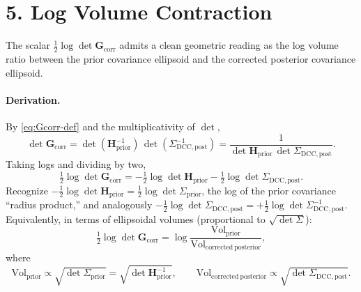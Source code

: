 \documentclass[11pt]{article}
\begin{document}
\section*{5. Log Volume Contraction}

The scalar $\tfrac{1}{2} \log \det \mathbf G_{\mathrm{corr}}$ admits a clean geometric reading as the log volume ratio between the prior covariance ellipsoid and the corrected posterior covariance ellipsoid.

\paragraph{Derivation.}
By \eqref{eq:Gcorr-def} and the multiplicativity of $\det$,
\begin{equation}
\det \mathbf G_{\mathrm{corr}}
=
\det(\mathbf H_{\mathrm{prior}}^{-1})\,
\det(\Sigma_{\mathrm{DCC},\mathrm{post}}^{-1})
=
\frac{1}{\det \mathbf H_{\mathrm{prior}}\, \det \Sigma_{\mathrm{DCC},\mathrm{post}}}.
\label{eq:detGcorr-ratio}
\end{equation}
Taking logs and dividing by two,
\begin{equation}
\tfrac{1}{2} \log \det \mathbf G_{\mathrm{corr}}
=
- \tfrac{1}{2} \log \det \mathbf H_{\mathrm{prior}}
- \tfrac{1}{2} \log \det \Sigma_{\mathrm{DCC},\mathrm{post}}.
\label{eq:logdetGcorr-decomp}
\end{equation}
Recognize $-\tfrac{1}{2} \log \det \mathbf H_{\mathrm{prior}} = \tfrac{1}{2} \log \det \Sigma_{\mathrm{prior}}$, the log of the prior covariance ``radius product,'' and analogously $-\tfrac{1}{2} \log \det \Sigma_{\mathrm{DCC},\mathrm{post}} = +\tfrac{1}{2} \log \det \Sigma_{\mathrm{DCC},\mathrm{post}}^{-1}$. Equivalently, in terms of ellipsoidal volumes (proportional to $\sqrt{\det \Sigma}$):
\begin{equation}
\tfrac{1}{2} \log \det \mathbf G_{\mathrm{corr}}
=
\log \frac{\mathrm{Vol}_{\mathrm{prior}}}{\mathrm{Vol}_{\mathrm{corrected\ posterior}}},
\label{eq:logdetGcorr-volume}
\end{equation}
where
\begin{equation}
\mathrm{Vol}_{\mathrm{prior}} \propto \sqrt{\det \Sigma_{\mathrm{prior}}}
=
\sqrt{\det \mathbf H_{\mathrm{prior}}^{-1}},
\qquad
\mathrm{Vol}_{\mathrm{corrected\ posterior}} \propto \sqrt{\det \Sigma_{\mathrm{DCC},\mathrm{post}}}.
\label{eq:vol-defs}
\end{equation}
\end{document}
